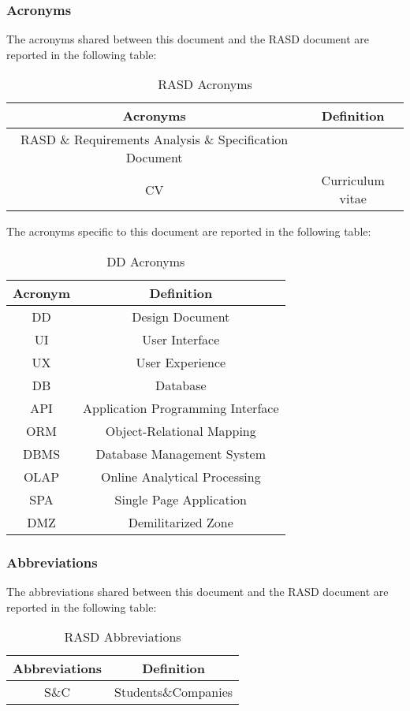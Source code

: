 \subsubsection{Acronyms}
The acronyms shared between this document and the RASD document are reported in the following table:\\
\begin{table}[H]
    \centering
\begin{tabular}{|c|c|}
        \hline
        \textbf{Acronyms} & \textbf{Definition} \\ \hline
        RASD \& Requirements Analysis \& Specification Document\\ \hline
        CV & Curriculum vitae\\ \hline
    \end{tabular}
    \caption{RASD Acronyms}
    \label{tab:RASDacronyms}
\end{table}
The acronyms specific to this document are reported in the following table:
\begin{table}[H]
    \centering
    \begin{tabular}{|c|c|}
        \hline
        \textbf{Acronym} & \textbf{Definition} \\ \hline
        DD & Design Document \\ \hline
        UI & User Interface \\ \hline
        UX & User Experience \\ \hline
        DB & Database \\ \hline
        API & Application Programming Interface \\ \hline
        ORM & Object-Relational Mapping \\ \hline
        DBMS & Database Management System \\ \hline
        OLAP & Online Analytical Processing \\ \hline
        SPA & Single Page Application \\ \hline
        DMZ & Demilitarized Zone \\ \hline
    \end{tabular}
    \caption{DD Acronyms}
    \label{tab:DDacronyms}
\end{table}

\subsubsection{Abbreviations}
The abbreviations shared between this document and the RASD document are reported in the following table:
\begin{table}[H]
    \centering
\begin{tabular}{|c|c|}
        \hline
        \textbf{Abbreviations} & \textbf{Definition} \\ \hline
        S\&C & Students\&Companies \\ \hline
    \end{tabular}
    \caption{RASD Abbreviations}
    \label{tab:abbreviations}
\end{table}
